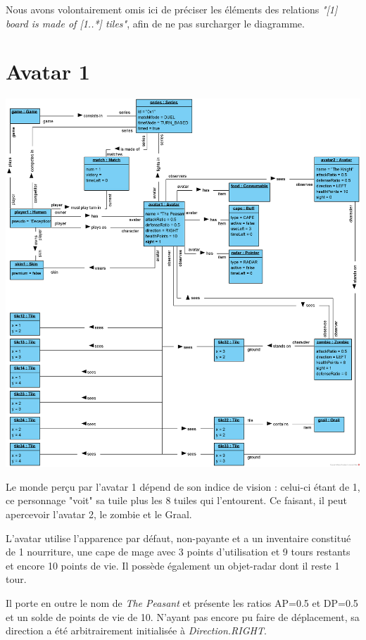 \documentclass[oneside,a4paper]{book}
\begin{document}
    \begin{tcolorbox}
    Nous avons volontairement omis ici de préciser les éléments des relations \textit{"[1] board is made of [1..*] tiles"}, afin de ne pas surcharger le diagramme.
    \end{tcolorbox}

\section{Avatar 1}
\includegraphics[width=\textwidth,height=\textheight,keepaspectratio]{Diagrams/OD-Player1.png}\newline

Le monde perçu par l'avatar 1 dépend de son indice de vision : celui-ci étant de 1, ce personnage "voit" sa tuile plus les 8 tuiles qui l'entourent. Ce faisant, il peut apercevoir l'avatar 2, le zombie et le Graal.\newline

L'avatar utilise l'apparence par défaut, non-payante et a un inventaire constitué de 1 nourriture, une cape de mage avec 3 points d'utilisation et 9 tours restants et encore 10 points de vie. Il possède également un objet-radar dont il reste 1 tour.\newline

Il porte en outre le nom de \textit{The Peasant} et présente les ratios AP=0.5 et DP=0.5 et un solde de points de vie de 10. N'ayant pas encore pu faire de déplacement, sa direction a été arbitrairement initialisée à \textit{Direction.RIGHT}.\newline
\end{document}
